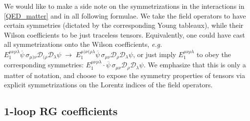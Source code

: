 \documentclass[12pt]{revtex4}
\newcommand{\wt}{\widetilde}
\newcommand{\ov}{\overline}
\begin{document}
	We would like to make a side note on the symmetrizations in the 
	interactions in \eqref{QED_matter} and in all following formulae.
	We take the field operators to have certain symmetries 
	(dictated by the corresponding Young tableaux), while their Wilson
	coefficients to be just traceless tensors. 
	Equivalently, one could have cast all symmetrizations onto the
	Wilson coefficients, {\it e.g.}
$	E_1^{\mu\nu\rho\lambda}
	\ov{\psi}\, \sigma_{\mu)\nu} \mathcal{D}_{(\rho}\mathcal{D}_\lambda 
	\psi 
	\;\to\;
	E_1^{\mu)\nu(\rho\lambda}
	\ov{\psi}\, \sigma_{\mu\nu} \mathcal{D}_{\rho}\mathcal{D}_\lambda 
	\psi $,
	or just imply $ E_1^{\mu\nu\rho\lambda} $ to obey the corresponding
	symmetries: 
$	E_1^{\mu\nu\rho\lambda}\cdot
	\ov{\psi}\, \sigma_{\mu\nu} \mathcal{D}_{\rho}\mathcal{D}_\lambda 
	\psi $.
	We emphasize that this is only a matter of notation, and choose
	to expose the symmetry properties of tensors via explicit 
	symmetrizations on the Lorentz indices of the field operators.


\subsection{1-loop RG coefficients}
\end{document}
